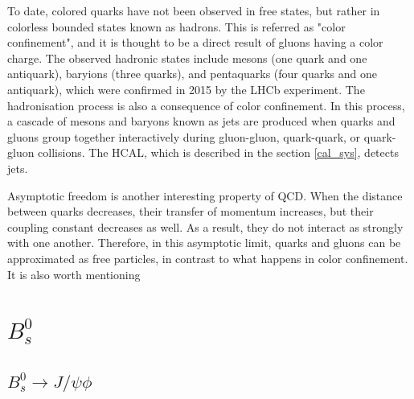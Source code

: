 To date, colored quarks have not been observed in free states, but rather in colorless bounded states known as hadrons. This is referred as "color confinement", and it is thought to be a direct result of gluons having a color charge. The observed hadronic states include mesons (one quark and one antiquark), baryions (three quarks), and pentaquarks (four quarks and one antiquark), which were confirmed in 2015 by the LHCb experiment. The hadronisation process is also a consequence of color confinement.  In this process, a cascade of mesons and baryons known as jets are produced when quarks and gluons group together interactively during gluon-gluon, quark-quark, or quark-gluon collisions.  The HCAL, which is described in the section \ref{cal_sys}, detects jets.

Asymptotic freedom is another interesting property of QCD. When the distance between quarks decreases, their transfer of momentum increases, but their coupling constant decreases as well. As a result, they do not interact as strongly with one another. Therefore, in this asymptotic limit, quarks and gluons can be approximated as free particles, in contrast to what happens in color confinement. It is also worth mentioning 

\section{$B^0_s$}
\subsection{$B^0_s \to J/\psi\phi$}
